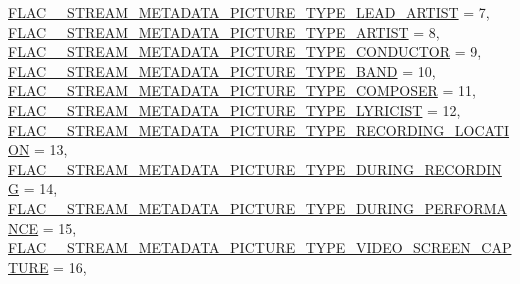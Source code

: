 \begin{DoxyCompactItemize}
\mbox{\hyperlink{group__flac__format_ggaf6d3e836cee023e0b8d897f1fdc9825da1282e252e20553c39907074052960f42}{F\+L\+A\+C\+\_\+\+\_\+\+S\+T\+R\+E\+A\+M\+\_\+\+M\+E\+T\+A\+D\+A\+T\+A\+\_\+\+P\+I\+C\+T\+U\+R\+E\+\_\+\+T\+Y\+P\+E\+\_\+\+L\+E\+A\+D\+\_\+\+A\+R\+T\+I\+ST}} = 7, 
\newline
\mbox{\hyperlink{group__flac__format_ggaf6d3e836cee023e0b8d897f1fdc9825da4cead70f8720f180fc220e6df8d55cce}{F\+L\+A\+C\+\_\+\+\_\+\+S\+T\+R\+E\+A\+M\+\_\+\+M\+E\+T\+A\+D\+A\+T\+A\+\_\+\+P\+I\+C\+T\+U\+R\+E\+\_\+\+T\+Y\+P\+E\+\_\+\+A\+R\+T\+I\+ST}} = 8, 
\mbox{\hyperlink{group__flac__format_ggaf6d3e836cee023e0b8d897f1fdc9825dae01a47af0b0c4d89500b755ebca866ce}{F\+L\+A\+C\+\_\+\+\_\+\+S\+T\+R\+E\+A\+M\+\_\+\+M\+E\+T\+A\+D\+A\+T\+A\+\_\+\+P\+I\+C\+T\+U\+R\+E\+\_\+\+T\+Y\+P\+E\+\_\+\+C\+O\+N\+D\+U\+C\+T\+OR}} = 9, 
\mbox{\hyperlink{group__flac__format_ggaf6d3e836cee023e0b8d897f1fdc9825da8515523b4c9ab65ffef7db98bc09ceb1}{F\+L\+A\+C\+\_\+\+\_\+\+S\+T\+R\+E\+A\+M\+\_\+\+M\+E\+T\+A\+D\+A\+T\+A\+\_\+\+P\+I\+C\+T\+U\+R\+E\+\_\+\+T\+Y\+P\+E\+\_\+\+B\+A\+ND}} = 10, 
\mbox{\hyperlink{group__flac__format_ggaf6d3e836cee023e0b8d897f1fdc9825da5ea1554bc96deb45731bc5897600d1c2}{F\+L\+A\+C\+\_\+\+\_\+\+S\+T\+R\+E\+A\+M\+\_\+\+M\+E\+T\+A\+D\+A\+T\+A\+\_\+\+P\+I\+C\+T\+U\+R\+E\+\_\+\+T\+Y\+P\+E\+\_\+\+C\+O\+M\+P\+O\+S\+ER}} = 11, 
\newline
\mbox{\hyperlink{group__flac__format_ggaf6d3e836cee023e0b8d897f1fdc9825da86159eda8969514f5992b3e341103f22}{F\+L\+A\+C\+\_\+\+\_\+\+S\+T\+R\+E\+A\+M\+\_\+\+M\+E\+T\+A\+D\+A\+T\+A\+\_\+\+P\+I\+C\+T\+U\+R\+E\+\_\+\+T\+Y\+P\+E\+\_\+\+L\+Y\+R\+I\+C\+I\+ST}} = 12, 
\mbox{\hyperlink{group__flac__format_ggaf6d3e836cee023e0b8d897f1fdc9825dac96e810cdd81465709b4a3a03289e89c}{F\+L\+A\+C\+\_\+\+\_\+\+S\+T\+R\+E\+A\+M\+\_\+\+M\+E\+T\+A\+D\+A\+T\+A\+\_\+\+P\+I\+C\+T\+U\+R\+E\+\_\+\+T\+Y\+P\+E\+\_\+\+R\+E\+C\+O\+R\+D\+I\+N\+G\+\_\+\+L\+O\+C\+A\+T\+I\+ON}} = 13, 
\mbox{\hyperlink{group__flac__format_ggaf6d3e836cee023e0b8d897f1fdc9825da8cee3bb376ed1044b3a7e20b9c971ff1}{F\+L\+A\+C\+\_\+\+\_\+\+S\+T\+R\+E\+A\+M\+\_\+\+M\+E\+T\+A\+D\+A\+T\+A\+\_\+\+P\+I\+C\+T\+U\+R\+E\+\_\+\+T\+Y\+P\+E\+\_\+\+D\+U\+R\+I\+N\+G\+\_\+\+R\+E\+C\+O\+R\+D\+I\+NG}} = 14, 
\mbox{\hyperlink{group__flac__format_ggaf6d3e836cee023e0b8d897f1fdc9825da4d4dc6904984370501865988d948de3f}{F\+L\+A\+C\+\_\+\+\_\+\+S\+T\+R\+E\+A\+M\+\_\+\+M\+E\+T\+A\+D\+A\+T\+A\+\_\+\+P\+I\+C\+T\+U\+R\+E\+\_\+\+T\+Y\+P\+E\+\_\+\+D\+U\+R\+I\+N\+G\+\_\+\+P\+E\+R\+F\+O\+R\+M\+A\+N\+CE}} = 15, 
\newline
\mbox{\hyperlink{group__flac__format_ggaf6d3e836cee023e0b8d897f1fdc9825da7adc2b194968b51768721de7bda39df9}{F\+L\+A\+C\+\_\+\+\_\+\+S\+T\+R\+E\+A\+M\+\_\+\+M\+E\+T\+A\+D\+A\+T\+A\+\_\+\+P\+I\+C\+T\+U\+R\+E\+\_\+\+T\+Y\+P\+E\+\_\+\+V\+I\+D\+E\+O\+\_\+\+S\+C\+R\+E\+E\+N\+\_\+\+C\+A\+P\+T\+U\+RE}} = 16, 

\end{DoxyCompactItemize}
